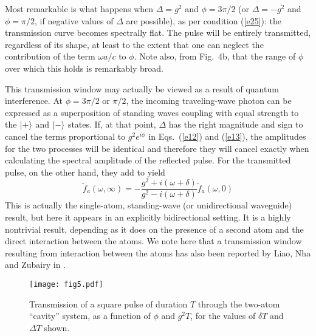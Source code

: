 \documentclass[aps,pra,twocolumn,floatfix,superscriptaddress]{revtex4}
\begin{document}
Most remarkable is what happens when $\Delta = g^2$ and $\phi=3\pi/2$ (or $\Delta = -g^2$ and $\phi=\pi/2$, if negative values of $\Delta$ are possible), as per condition (\ref{e25}):  the transmission curve becomes spectrally flat.  The pulse will be entirely transmitted, regardless of its shape, at least to the extent that one can neglect the contribution of the term $\omega a/c$ to $\phi$.  Note also, from Fig.~4b, that the range of $\phi$ over which this holds is remarkably broad.  

This transmission window may actually be viewed as a result of quantum interference.  At $\phi=3\pi/2$ or $\pi/2$, the incoming traveling-wave photon can be expressed as a superposition of standing waves coupling with equal strength to the $|+\rangle$ and $|-\rangle$ states. If, at that point, $\Delta$ has the right magnitude and sign to cancel the terms proportional to $g^2e^{i\phi}$ in Eqs.~(\ref{e12}) and (\ref{e13}), the amplitudes for the two processes will be identical and therefore they will cancel exactly when calculating the spectral amplitude of the reflected pulse. For the transmitted pulse, on the other hand, they add to yield 
\begin{equation}
\tilde f_a(\omega,\infty) = -\frac{g^2+i(\omega+\delta)}{g^2-i(\omega+\delta)}\tilde f_a(\omega,0)
\label{ne26}
\end{equation}
This is actually the single-atom, standing-wave (or unidirectional waveguide) result, but here it appears in an explicitly bidirectional setting.  It is a highly nontrivial result, depending as it does on the presence of a second atom and the direct interaction between the atoms. We note here that a transmission window resulting from interaction between the atoms has also been reported by Liao, Nha and Zubairy in \cite{interactions}.

\begin{figure*}
\texttt{[image: fig5.pdf]}
\caption{\label{fig5} Transmission of a square pulse of duration $T$ through the two-atom ``cavity'' system, as a function of $\phi$ and $g^2 T$, for the values of $\delta T$ and $\Delta T$ shown. }
\end{figure*}
\end{document}
